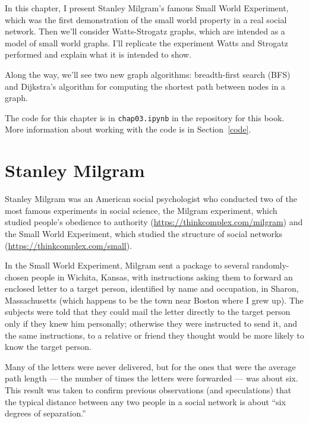 \documentclass[12pt]{book}
\theoremstyle{exercise}
\begin{document}
In this chapter, I present Stanley Milgram's famous Small World
Experiment, which was the first demonstration of
the small world property in a real social network.  Then we'll
consider Watts-Strogatz graphs, which are intended as a model of
small world graphs.  I'll replicate the experiment Watts and Strogatz performed and explain what it is intended to show.

Along the way, we'll see two new graph algorithms: breadth-first
search (BFS) and Dijkstra's algorithm for computing the shortest
path between nodes in a graph.

The code for this chapter is in {\tt chap03.ipynb} in the repository
for this book.  More information about working with the code is
in Section~\ref{code}.

\section{Stanley Milgram}

Stanley Milgram was an American social psychologist who conducted
two of the most famous experiments in social science, the
Milgram experiment, which studied people's obedience to authority
(\url{https://thinkcomplex.com/milgram})
and the Small World Experiment, which studied
the structure of social networks
(\url{https://thinkcomplex.com/small}).


In the Small World Experiment, Milgram sent a package to several
randomly-chosen people in Wichita, Kansas, with instructions asking
them to forward an enclosed letter to a target person, identified by
name and occupation, in Sharon, Massachusetts (which happens to be the town near
Boston where I grew up).  The subjects were told that they could mail
the letter directly to the target person only if they knew him
personally; otherwise they were instructed to send it, and the same
instructions, to a relative or friend they thought would be more
likely to know the target person.


Many of the letters were never delivered, but for the ones that
were the average path length --- the number of
times the letters were forwarded --- was about six.  This result
was taken to confirm previous observations (and speculations) that
the typical distance between any two people in a social network
is about ``six degrees of separation.''
\end{document}
